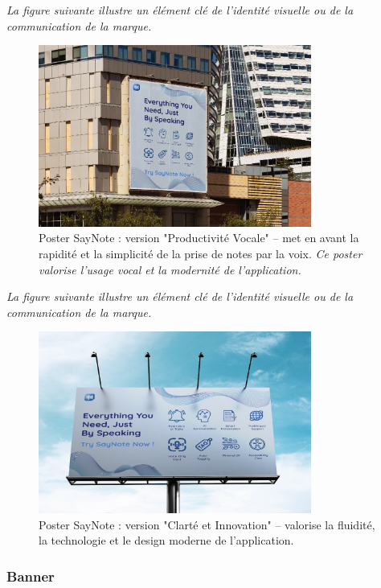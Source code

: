 \noindent
\textit{La figure suivante illustre un élément clé de l'identité visuelle ou de la communication de la marque.}
\begin{figure}[H]
    \centering
    \includegraphics[width=0.8\textwidth]{docs/visual-indentity/pictures/poster2.jpg}
    \caption{Poster SayNote : version "Productivité Vocale" – met en avant la rapidité et la simplicité de la prise de notes par la voix. \newline\textit{Ce poster valorise l'usage vocal et la modernité de l'application.}}
\end{figure}
\noindent
\textit{La figure suivante illustre un élément clé de l'identité visuelle ou de la communication de la marque.}
\begin{figure}[H]
    \centering
    \includegraphics[width=0.8\textwidth]{docs/visual-indentity/pictures/poster.jpg}
    \caption{Poster SayNote : version "Clarté et Innovation" – valorise la fluidité, la technologie et le design moderne de l’application.}
\end{figure}

\subsubsection{Banner}
